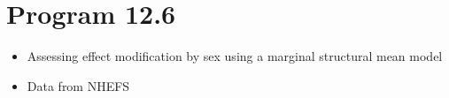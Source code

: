 \documentclass[
  10pt,
  a4paper,
]{book}
\newenvironment{Shaded}{\begin{snugshade}}{\end{snugshade}}
\newcommand{\DocumentationTok}[1]{\textcolor[rgb]{0.37,0.37,0.37}{\textit{#1}}}
\newcommand{\FunctionTok}[1]{\textcolor[rgb]{0.28,0.35,0.67}{#1}}
\newcommand{\NormalTok}[1]{\textcolor[rgb]{0.00,0.46,0.62}{#1}}
\newcommand{\SpecialCharTok}[1]{\textcolor[rgb]{0.37,0.37,0.37}{#1}}
\providecommand{\tightlist}{%
  \setlength{\itemsep}{0pt}\setlength{\parskip}{0pt}}
\begin{document}
\hypertarget{program-12.6}{%
\section{Program 12.6}\label{program-12.6}}

\begin{itemize}
\tightlist
\item
  Assessing effect modification by sex using a marginal structural mean model
\item
  Data from NHEFS
\end{itemize}

\begin{Shaded}
\end{Shaded}
\end{document}
